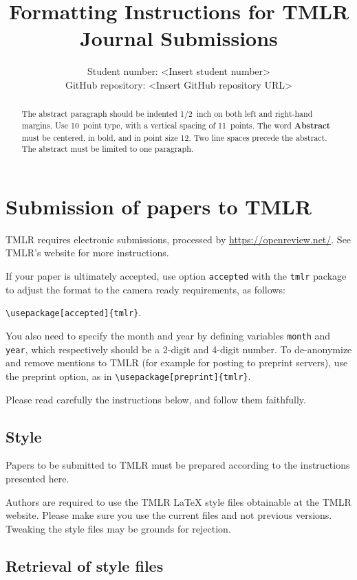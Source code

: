 \documentclass[10pt]{article} %
\title{Formatting Instructions for TMLR \\Journal Submissions}
\author{\name Student number: <Insert student number> \\
      \addr GitHub repository: <Insert GitHub repository URL>
      }
\begin{document}
\maketitle

\begin{abstract}
The abstract paragraph should be indented 1/2~inch on both left and
right-hand margins. Use 10~point type, with a vertical spacing of 11~points.
The word \textbf{\large Abstract} must be centered, in bold, and in point size 12. Two
line spaces precede the abstract. The abstract must be limited to one
paragraph.
\end{abstract}

\section{Submission of papers to TMLR}

TMLR requires electronic submissions, processed by
\url{https://openreview.net/}. See TMLR's website for more instructions.

If your paper is ultimately accepted, use option {\tt accepted} with the {\tt tmlr} 
package to adjust the format to the camera ready requirements, as follows:
\begin{center}  
  {\tt {\textbackslash}usepackage[accepted]\{tmlr\}}. 
\end{center}
You also need to specify the month and year
by defining variables {\tt month} and {\tt year}, which respectively
should be a 2-digit and 4-digit number. To de-anonymize and remove mentions
to TMLR (for example for posting to preprint servers), use the preprint option,
as in {\tt {\textbackslash}usepackage[preprint]\{tmlr\}}. 

Please read carefully the instructions below, and follow them
faithfully.

\subsection{Style}

Papers to be submitted to TMLR must be prepared according to the
instructions presented here.

Authors are required to use the TMLR \LaTeX{} style files obtainable at the
TMLR website. Please make sure you use the current files and
not previous versions. Tweaking the style files may be grounds for rejection.

\subsection{Retrieval of style files}
\end{document}
